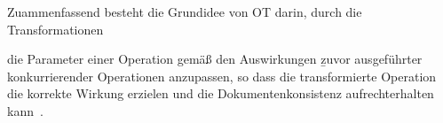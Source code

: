 Zuammenfassend besteht die Grundidee von \gls{OT} darin, 
durch die Transformationen


die Parameter einer Operation gemäß den Auswirkungen \b{zuvor ausgeführter} konkurrierender Operationen anzupassen, so dass die transformierte Operation die korrekte Wirkung erzielen und die Dokumentenkonsistenz aufrechterhalten kann~\cite{ot-later}.
%
%
%
